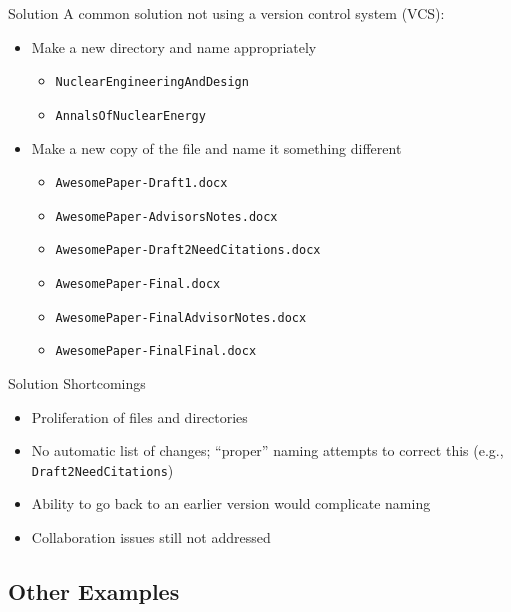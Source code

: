 \documentclass[10pt,t,xcolor=table]{UWMadBeamer}
\newenvironment{Itemize}
    {\begin{itemize}\setlength{\itemsep}{0.50em}\setlength{\leftmargin}{0.0em}\setlength{\labelwidth}{0em}}
    {\end{itemize}}
\begin{document}
    \begin{frame}{Solution}
        A common solution not using a version control system (VCS):

        \begin{Itemize}
            \item{Make a new directory and name appropriately}
            \begin{Itemize}
                \item{\texttt{NuclearEngineeringAndDesign}}
                \item{\texttt{AnnalsOfNuclearEnergy}}
            \end{Itemize}
            \item{Make a new copy of the file and name it something different}
            \begin{Itemize}
                \item{\texttt{AwesomePaper-Draft1.docx}}
                \item{\texttt{AwesomePaper-AdvisorsNotes.docx}}
                \item{\texttt{AwesomePaper-Draft2NeedCitations.docx}}
                \item{\texttt{AwesomePaper-Final.docx}}
                \item{\texttt{AwesomePaper-FinalAdvisorNotes.docx}}
                \item{\texttt{AwesomePaper-FinalFinal.docx}}
            \end{Itemize}
        \end{Itemize}
    \end{frame}

    \begin{frame}{Solution Shortcomings}
        \begin{Itemize}
            \item{Proliferation of files and directories}
            \item{No automatic list of changes; ``proper'' naming attempts to correct this (e.g., \texttt{Draft2NeedCitations})}
            \item{Ability to go back to an earlier version would complicate naming}
            \item{Collaboration issues still not addressed}
        \end{Itemize}
    \end{frame}

    \subsection{Other Examples}
\end{document}
